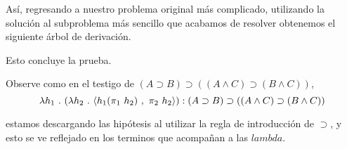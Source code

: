 \documentclass{article}
\begin{document}
\begin{example}
\begin{prooftree}
    \end{prooftree}


    Así, regresando a nuestro problema original más complicado, utilizando la solución al subproblema más sencillo que acabamos de resolver obtenemos el siguiente árbol de derivación.

    \begin{prooftree}
    \end{prooftree}

    Esto concluye la prueba.

    Observe como en el testigo de $(A \supset B) \supset ((A \land C) \supset (B \land C))$, 
    $$
    \lambda h_1\ .\ (\lambda h_2\ .\ \picopar{h_1 (\pi_1\ h_2)\ ,\ \pi_2\ h_2}): (A \supset B) \supset ((A \land C) \supset (B \land C))
    $$

    estamos descargando las hipótesis al utilizar la regla de introducción de
    $\supset$, y esto se ve reflejado en los terminos que acompañan a las
    $lambda$.

\end{example}
\end{document}
